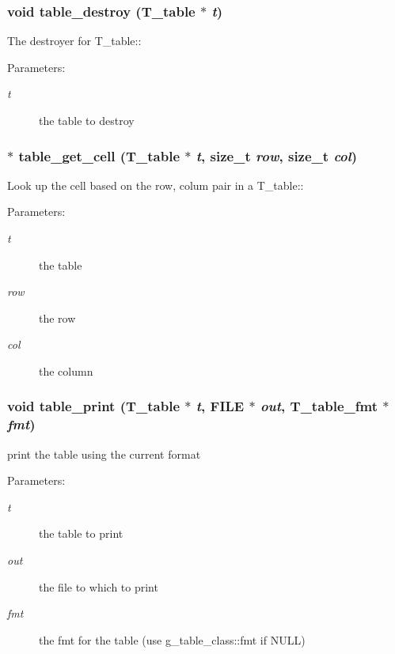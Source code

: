 \subsubsection{\setlength{\rightskip}{0pt plus 5cm}void table\_\-destroy ({\bf T\_\-table} $\ast$ {\em t})}\label{table_8h_a28}


The destroyer for T\_\-table::\begin{Desc}
\item[Parameters: ]\par
\begin{description}
\item[{\em 
t}]the table to destroy \end{description}
\end{Desc}
\subsubsection{$\ast$ table\_\-get\_\-cell ({\bf T\_\-table} $\ast$ {\em t}, size\_\-t {\em row}, size\_\-t {\em col})}\label{table_8h_a29}


Look up the cell based on the row, colum pair in a T\_\-table::\begin{Desc}
\item[Parameters: ]\par
\begin{description}
\item[{\em 
t}]the table \item[{\em 
row}]the row \item[{\em 
col}]the column \end{description}
\end{Desc}
\subsubsection{\setlength{\rightskip}{0pt plus 5cm}void table\_\-print ({\bf T\_\-table} $\ast$ {\em t}, FILE $\ast$ {\em out}, {\bf T\_\-table\_\-fmt} $\ast$ {\em fmt})}\label{table_8h_a36}


print the table using the current format\begin{Desc}
\item[Parameters: ]\par
\begin{description}
\item[{\em 
t}]the table to print \item[{\em 
out}]the file to which to print \item[{\em 
fmt}]the fmt for the table (use g\_\-table\_\-class::fmt if NULL) \end{description}
\end{Desc}
